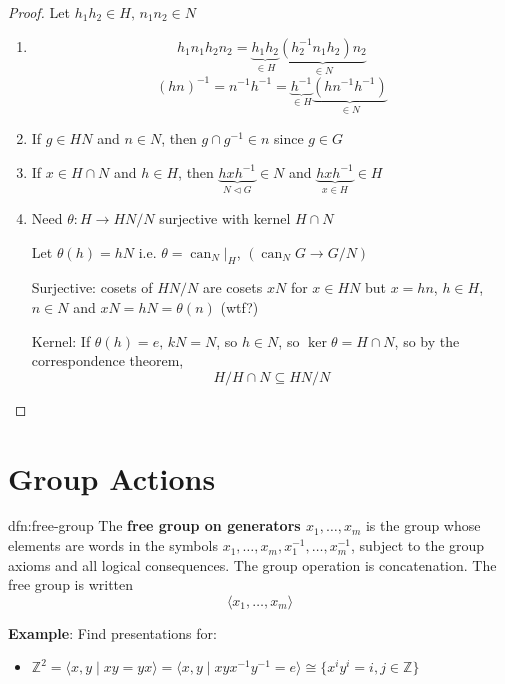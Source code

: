 \documentclass{article}
\DeclareMathOperator{\can}{can}
\begin{document}
\begin{proof}
    Let $h_{1}h_{2} \in H,\,n_{1}n_{2}\in N$
    \begin{enumerate}
        \item \[h_{1}n_{1} h_{2}n_{2} = \underbrace{h_{1}h_{2}}_{\in H}\underbrace{(h_{2}^{-1}n_{1}h_{2})n_{2}}_{\in N}\]
            \[(hn)^{-1} = n^{-1}h^{-1} = \underbrace{h^{-1}}_{\in H}\underbrace{(hn^{-1}h^{-1})}_{\in N}\]
    \item If $g\in HN$ and $n\in N$, then $g \cap g^{-1}\in n$ since $g\in G$
    \item If $x\in H \cap N$ and $h\in H$, then $\underbrace{hxh^{-1}}_{N \triangleleft G}\in N$ and $\underbrace{hxh^{-1}}_{x\in H} \in H$
    \item Need $\theta : H \to HN /N$ surjective with kernel $H \cap N$

        Let $\theta(h) = hN$ i.e. $\theta = \can_{N}\big\rvert_{H}$, $(\can_{N} G \to G /N)$

        Surjective: cosets of $HN /N$ are cosets $xN$ for $x\in HN$ but $x = hn$, $h\in H$, $n\in N$ and $xN = hN = \theta(n)$ (wtf?)

        Kernel: If $\theta(h) = e,\, kN = N$, so $h\in N$, so $\ker \theta = H \cap N$, so by the correspondence theorem,
        \[H / H \cap N \subseteq HN /N\]
    \end{enumerate}
\end{proof}

\newpage
\section{Group Actions}

\begin{dfn}{dfn:free-group}{}
    The \textbf{free group on generators $x_{1},\dots,x_{m}$} is the group whose elements are words in the symbols $x_{1},\dots,x_{m},x_{1}^{-1},\dots,x_{m}^{-1}$, subject to the group axioms and all logical consequences. The group operation is concatenation. The free group is written
    \[\langle x_{1},\dots,x_{m} \rangle\]
\end{dfn}

\textbf{Example}: Find presentations for:
\begin{itemize}
    \item $\mathbb{Z}^{2} = \langle x, y \mid xy = yx \rangle = \langle x, y \mid xyx^{-1}y^{-1} = e \rangle \cong \{x^{i}y^{i} = i, j \in \mathbb{Z}\}$
\end{itemize}
\end{document}
